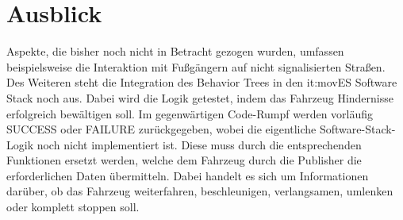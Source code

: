 \section{Ausblick}

Aspekte, die bisher noch nicht in Betracht gezogen wurden, umfassen beispielsweise die Interaktion mit Fußgängern auf nicht signalisierten Straßen. Des Weiteren steht die Integration des Behavior Trees in den it:movES Software Stack noch aus. Dabei wird die Logik getestet, indem das Fahrzeug Hindernisse erfolgreich bewältigen soll. Im gegenwärtigen Code-Rumpf werden vorläufig SUCCESS oder FAILURE zurückgegeben, wobei die eigentliche Software-Stack-Logik noch nicht implementiert ist. Diese muss durch die entsprechenden Funktionen ersetzt werden, welche dem Fahrzeug durch die Publisher die erforderlichen Daten übermitteln. Dabei handelt es sich um Informationen darüber, ob das Fahrzeug weiterfahren, beschleunigen, verlangsamen, umlenken oder komplett stoppen soll.